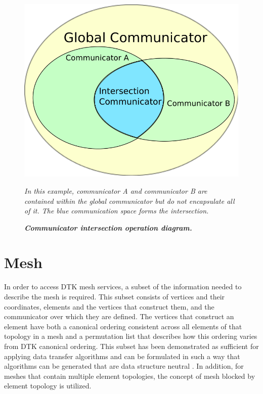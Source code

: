 \documentclass[letterpaper,12pt]{article}
\begin{document}
\begin{figure}[htpb!]
  \centering \includegraphics[width=5in]{intersection_comm.pdf}
  \caption{\bf \sl Communicator intersection operation diagram.}{\sl
    In this example, communicator A and communicator B are contained
    within the global communicator but do not encapsulate all of
    it. The blue communication space forms the intersection.}
  \label{fig:comm_intersection}
\end{figure}

\clearpage

\section{Mesh}\label{sec:mesh}
In order to access DTK mesh services, a subset of the information
needed to describe the mesh is required. This subset consists of
vertices and their coordinates, elements and the vertices that
construct them, and the communicator over which they are defined. The
vertices that construct an element have both a canonical ordering
consistent across all elements of that topology in a mesh and a
permutation list that describes how this ordering varies from DTK
canonical ordering. This subset has been demonstrated as sufficient
for applying data transfer algorithms \cite{Stewart_2004} and can be
formulated in such a way that algorithms can be generated that are
data structure neutral \cite{Chand_2008}. In addition, for meshes that
contain multiple element topologies, the concept of mesh blocked by
element topology is utilized.
\end{document}
